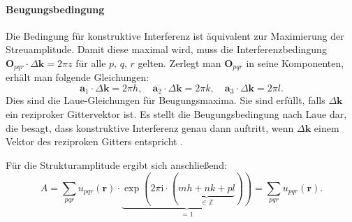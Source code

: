 \paragraph{Beugungsbedingung}
Die Bedingung für konstruktive Interferenz ist äquivalent zur Maximierung der Streuamplitude.
Damit diese maximal wird, muss die Interferenzbedingung $\mathbf{O}_{pqr}\cdot\Delta \mathbf{k} =2\pi z$
für alle $p$, $q$, $r$ gelten.
Zerlegt man $\mathbf{O}_{pqr}$ in seine Komponenten, erhält man folgende Gleichungen:
\begin{equation}
    \mathbf{a}_{1}\cdot\Delta \mathbf{k} = 2\pi h, \quad
    \mathbf{a}_{2}\cdot\Delta \mathbf{k} = 2\pi k, \quad
    \mathbf{a}_{3}\cdot\Delta \mathbf{k} = 2\pi l.
    \label{eq:lauebedingung}
\end{equation}
Dies sind die Laue-Gleichungen für Beugungsmaxima.
Sie sind erfüllt, falls $\Delta \mathbf{k}$ ein reziproker Gittervektor ist.
Es stellt die Beugungsbedingung nach Laue dar, die besagt, dass konstruktive Interferenz genau dann auftritt,
wenn $\Delta \mathbf{k}$ einem Vektor des reziproken Gitters entspricht \autocite{Ashcroft}.

Für die Strukturamplitude ergibt sich anschließend:
\begin{equation}
    A = \sum_{pqr} u_{pqr}(\mathbf{r}) \cdot\underbrace{ \exp(2\pi \mathrm{i}
    \cdot(\underbrace{ mh+nk+pl }_{ \in\mathbb{Z} })) }_{ =1 }
    = \sum_{pqr} u_{pqr}(\mathbf{r}).
    \label{eq:strukturamplitude}
\end{equation}

